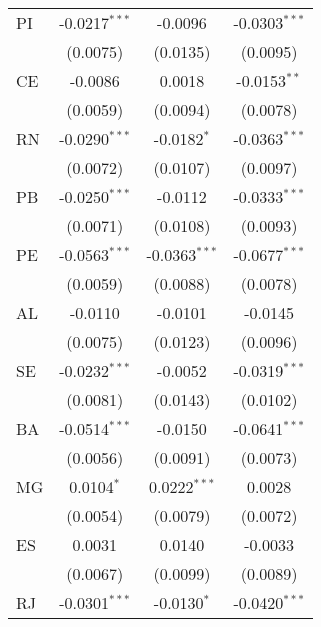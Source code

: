 \begin{tabular}{lccc}
   PI              & -0.0217$^{***}$         & -0.0096                 & -0.0303$^{***}$\\   
                   & (0.0075)                & (0.0135)                & (0.0095)\\   
   CE              & -0.0086                 & 0.0018                  & -0.0153$^{**}$\\   
                   & (0.0059)                & (0.0094)                & (0.0078)\\   
   RN              & -0.0290$^{***}$         & -0.0182$^{*}$           & -0.0363$^{***}$\\   
                   & (0.0072)                & (0.0107)                & (0.0097)\\   
   PB              & -0.0250$^{***}$         & -0.0112                 & -0.0333$^{***}$\\   
                   & (0.0071)                & (0.0108)                & (0.0093)\\   
   PE              & -0.0563$^{***}$         & -0.0363$^{***}$         & -0.0677$^{***}$\\   
                   & (0.0059)                & (0.0088)                & (0.0078)\\   
   AL              & -0.0110                 & -0.0101                 & -0.0145\\   
                   & (0.0075)                & (0.0123)                & (0.0096)\\   
   SE              & -0.0232$^{***}$         & -0.0052                 & -0.0319$^{***}$\\   
                   & (0.0081)                & (0.0143)                & (0.0102)\\   
   BA              & -0.0514$^{***}$         & -0.0150                 & -0.0641$^{***}$\\   
                   & (0.0056)                & (0.0091)                & (0.0073)\\   
   MG              & 0.0104$^{*}$            & 0.0222$^{***}$          & 0.0028\\   
                   & (0.0054)                & (0.0079)                & (0.0072)\\   
   ES              & 0.0031                  & 0.0140                  & -0.0033\\   
                   & (0.0067)                & (0.0099)                & (0.0089)\\   
   RJ              & -0.0301$^{***}$         & -0.0130$^{*}$           & -0.0420$^{***}$\\   

\end{tabular}
